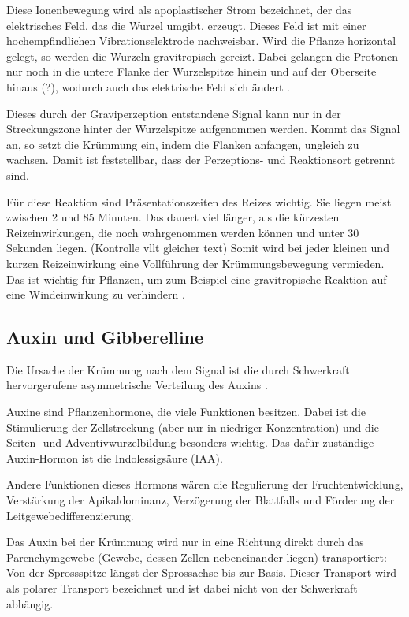 \documentclass[
a4paper, 
11pt, 
ngerman,
listof=totoc,
bibliography=totocnumbered,
abstracton
]{scrreprt}
\begin{document}
Diese Ionenbewegung wird als apoplastischer Strom bezeichnet, der das elektrisches Feld, das die Wurzel umgibt, erzeugt. Dieses Feld ist mit einer hochempfindlichen Vibrationselektrode nachweisbar. 
Wird die Pflanze horizontal gelegt, so werden die Wurzeln gravitropisch gereizt. Dabei gelangen die Protonen nur noch in die untere Flanke der Wurzelspitze hinein und auf der Oberseite hinaus (?), wodurch auch das elektrische Feld sich ändert \parencite[502f]{Nultsch}.



Dieses durch der Graviperzeption entstandene Signal kann nur in der Streckungszone hinter der Wurzelspitze aufgenommen werden. Kommt das Signal an, so setzt die Krümmung ein, indem die Flanken anfangen, ungleich zu wachsen. Damit ist feststellbar, dass der Perzeptions- und Reaktionsort getrennt sind.

Für diese Reaktion sind Präsentationszeiten des Reizes wichtig. Sie liegen meist zwischen 2 und 85 Minuten. Das dauert viel länger, als die kürzesten Reizeinwirkungen, die noch wahrgenommen werden können und unter 30 Sekunden liegen. (Kontrolle vllt gleicher text)
Somit wird bei jeder kleinen und kurzen Reizeinwirkung eine Vollführung der Krümmungsbewegung vermieden. Das ist wichtig für Pflanzen, um zum Beispiel eine gravitropische Reaktion auf eine Windeinwirkung zu verhindern \parencite[531]{Luettge}.


\subsection{Auxin und Gibberelline}

Die Ursache der Krümmung nach dem Signal ist die durch Schwerkraft hervorgerufene asymmetrische Verteilung des Auxins  \parencite[502f]{Nultsch}.

Auxine sind Pflanzenhormone, die viele Funktionen besitzen. Dabei ist die Stimulierung der Zellstreckung (aber nur in niedriger Konzentration) und die Seiten- und Adventivwurzelbildung besonders wichtig. Das dafür zuständige Auxin-Hormon ist die Indolessigsäure (IAA).

Andere Funktionen dieses Hormons wären die Regulierung der Fruchtentwicklung, Verstärkung der Apikaldominanz, Verzögerung der Blattfalls und Förderung der Leitgewebedifferenzierung.

Das Auxin bei der Krümmung wird nur in eine Richtung direkt durch das Parenchymgewebe (Gewebe, dessen Zellen nebeneinander liegen) transportiert: Von der Sprossspitze längst der Sprossachse bis zur Basis. Dieser Transport wird als polarer Transport bezeichnet und ist dabei nicht von der Schwerkraft abhängig.
\end{document}
